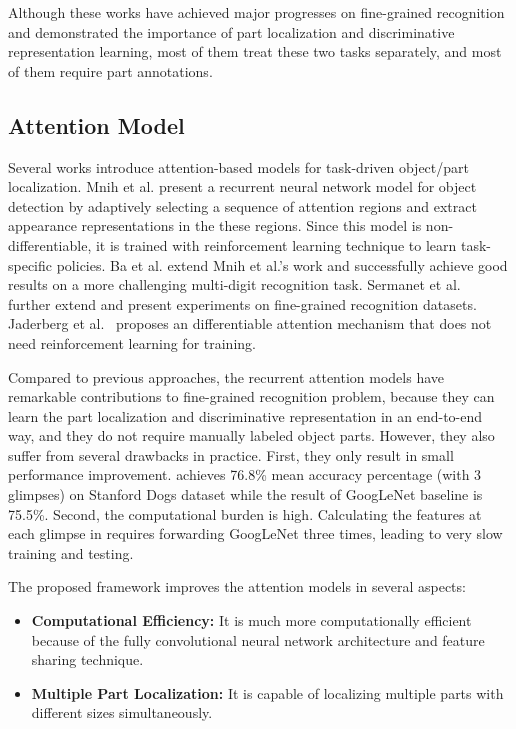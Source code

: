 \documentclass[runningheads]{llncs}
\begin{document}
Although these works have achieved major progresses on fine-grained recognition and demonstrated the importance of part localization and discriminative representation learning, most of them treat these two tasks separately,
and most of them require part annotations.

\subsection{Attention Model}
Several works introduce attention-based models for task-driven object/part localization.
Mnih et al. \cite{bd1} present a recurrent neural network model for object detection by adaptively selecting a sequence of attention regions and extract appearance  representations in the these regions.
Since this model is non-differentiable, it  is trained with reinforcement learning technique to learn  task-specific policies.
Ba et al. \cite{bd2} extend Mnih et al.'s work and successfully achieve good results on a more challenging multi-digit recognition task.
Sermanet et al.~\cite{bd3} further extend \cite{bd2} and present experiments on fine-grained recognition datasets.
Jaderberg et al.~\cite{jaderberg2015spatial} proposes an differentiable attention mechanism that does not need reinforcement learning for training.

Compared to previous approaches, the recurrent attention models \cite{bd1,bd2,bd3} have remarkable contributions to fine-grained recognition problem,
because they can learn the part localization and discriminative representation in an end-to-end way, and they do not require manually labeled object parts.
However, they also suffer from several drawbacks in practice. First, they only result in small performance improvement.
\cite{bd3}  achieves 76.8\% mean accuracy percentage (with 3 glimpses) on Stanford Dogs dataset while the result of GoogLeNet \cite{bd7} baseline is 75.5\%.
Second, the computational burden is high.
Calculating the features at each glimpse in \cite{bd3} requires forwarding GoogLeNet three times, leading to very slow training and testing.

The proposed framework improves the attention models in several aspects:
\begin{itemize}\vspace{-8pt}
\item {\bf Computational Efficiency:} It is much more computationally efficient because of the fully convolutional neural network architecture and feature sharing technique.
\item {\bf Multiple Part Localization:} It is capable of localizing multiple parts with different sizes simultaneously.
\end{itemize}
\end{document}

